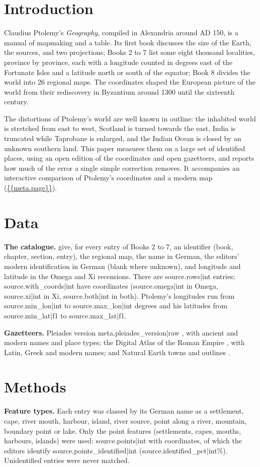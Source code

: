 \documentclass[11pt,a4paper]{article}
\begin{document}
\section{Introduction}
Claudius Ptolemy's \textit{Geography}, compiled in Alexandria around AD 150, is a manual of mapmaking and a table. Its first book discusses the size of the Earth, the sources, and two projections; Books 2 to 7 list some eight thousand localities, province by province, each with a longitude counted in degrees east of the Fortunate Isles and a latitude north or south of the equator; Book 8 divides the world into 26 regional maps. The coordinates shaped the European picture of the world from their rediscovery in Byzantium around 1300 until the sixteenth century.

The distortions of Ptolemy's world are well known in outline: the inhabited world is stretched from east to west, Scotland is turned towards the east, India is truncated while Taprobane is enlarged, and the Indian Ocean is closed by an unknown southern land. This paper measures them on a large set of identified places, using an open edition of the coordinates \citep{cat} and open gazetteers, and reports how much of the error a single simple correction removes. It accompanies an interactive comparison of Ptolemy's coordinates and a modern map (\url{{{meta.page}}}).

\section{Data}
\textbf{The catalogue.} \citet{cat} give, for every entry of Books 2 to 7, an identifier (book, chapter, section, entry), the regional map, the name in German, the editors' modern identification in German (blank where unknown), and longitude and latitude in the Omega and Xi recensions. There are {{source.rows|int}} entries; {{source.with_coords|int}} have coordinates ({{source.omega|int}} in Omega, {{source.xi|int}} in Xi, {{source.both|int}} in both). Ptolemy's longitudes run from {{source.min_lon|int}} to {{source.max_lon|int}} degrees and his latitudes from {{source.min_lat|f1}} to {{source.max_lat|f1}}.

\textbf{Gazetteers.} Pleiades version {{meta.pleiades_version|raw}} \citep{pleiades}, with ancient and modern names and place types; the Digital Atlas of the Roman Empire \citep{dare}, with Latin, Greek and modern names; and Natural Earth towns and outlines \citep{naturalearth}.

\section{Methods}
\textbf{Feature types.} Each entry was classed by its German name as a settlement, cape, river mouth, harbour, island, river source, point along a river, mountain, boundary point or lake. Only the point features (settlements, capes, mouths, harbours, islands) were used: {{source.points|int}} with coordinates, of which the editors identify {{source.points_identified|int}} ({{source.identified_pct|int}}\%). Unidentified entries were never matched.
\end{document}
